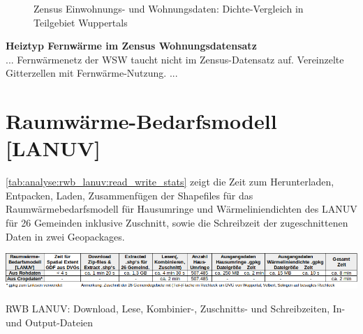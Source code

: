 			\begin{figure}[h]
				\centering
				\caption{Zensus Einwohnungs- und Wohnungsdaten: Dichte-Vergleich in Teilgebiet Wuppertals}
				\label{fig:analyse:zensus_pop_wohn_comparison}
			\end{figure}

		\textbf{Heiztyp Fernwärme im Zensus Wohnungsdatensatz}\\
		... Fernwärmenetz der WSW taucht nicht im Zensus-Datensatz auf. Vereinzelte Gitterzellen mit Fernwärme-Nutzung. ...
		
	\section{Raumwärme-Bedarfsmodell [LANUV]}
		\autoref{tab:analyse:rwb_lanuv:read_write_stats} zeigt die Zeit zum Herunterladen, Entpacken, Laden, Zusammenfügen der Shapefiles für das Raumwärmebedarfsmodell für Hausumringe und Wärmeliniendichten des LANUV für 26 Gemeinden inklusive Zuschnitt, sowie die Schreibzeit der zugeschnittenen Daten in zwei Geopackages. 
		
		\begin{table}[h]
			\centering
			\includegraphics[width=\linewidth]{./Medien/tables/read_write_stats/RWB_LANUV_read_write_stats.png}
			\caption{RWB LANUV: Download, Lese, Kombinier-, Zuschnitts- und Schreibzeiten, In- und Output-Dateien}
			\label{tab:analyse:rwb_lanuv:read_write_stats}
		\end{table}
		
